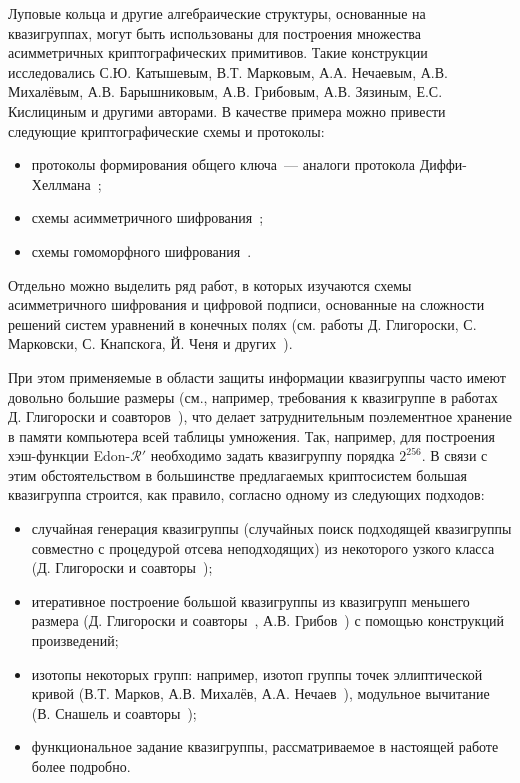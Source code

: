     Луповые кольца и другие алгебраические структуры, основанные на квазигруппах, могут быть использованы для построения множества асимметричных криптографических примитивов.
    Такие конструкции исследовались С.Ю. Катышевым, В.Т. Марковым, А.А. Нечаевым, А.В. Михалёвым, А.В. Барышниковым, А.В. Грибовым, А.В. Зязиным, Е.С. Кислициным и другими авторами.
    В качестве примера можно привести следующие криптографические схемы и протоколы:
    \begin{itemize}
        \item протоколы формирования общего ключа~--- аналоги протокола Диффи-Хеллмана~\autocite{DH14, DH16, baryshnikov2017key, quantum18};
        \item схемы асимметричного шифрования~\autocite{markov12, pke10, gribovphd};
        \item схемы гомоморфного шифрования~\autocite{gribovphd, homomo15, katyshev2020application, markov20}.
    \end{itemize}
    Отдельно можно выделить ряд работ, в которых изучаются схемы асимметричного шифрования и цифровой подписи, основанные на сложности решений систем уравнений в конечных полях (см. работы Д. Глигороски, С. Марковски, С. Кнапскога, Й. Ченя и других~\autocite{gligoroski2008public, gligoroski2008multivariate, chen2010multivariate, gligoroski2011mqq}).

    При этом применяемые в области защиты информации квазигруппы часто имеют довольно большие размеры (см., например, требования к квазигруппе в работах Д. Глигороски и соавторов~\autocite{EdonR, EdonRprime, chen2010multivariate}), что делает затруднительным поэлементное хранение в памяти компьютера всей таблицы умножения. 
    Так, например, для построения хэш-функции Edon-$\mathcal{R}'$ необходимо задать квазигруппу порядка $2^{256}$. 
    В связи с этим обстоятельством в большинстве предлагаемых криптосистем большая квазигруппа строится, как правило, согласно одному из следующих подходов:
    \begin{itemize}
        \item случайная генерация квазигруппы (случайных поиск подходящей квазигруппы совместно с процедурой отсева неподходящих) из некоторого узкого класса (Д. Глигороски и соавторы~\autocite{gligoroski2008public, chen2010multivariate});
        \item итеративное построение большой квазигруппы из квазигрупп меньшего размера (Д. Глигороски и соавторы~\autocite{EdonRprime}, А.В. Грибов~\autocite{gribovphd}) с помощью конструкций произведений;
        \item изотопы некоторых  групп: например, изотоп группы точек эллиптической кривой (В.Т. Марков, А.В. Михалёв, А.А. Нечаев~\autocite{DH16}), модульное вычитание (В. Снашель и соавторы~\autocite{snavsel2009hash});
        \item функциональное задание квазигруппы, рассматриваемое в настоящей работе более подробно.
    \end{itemize}

